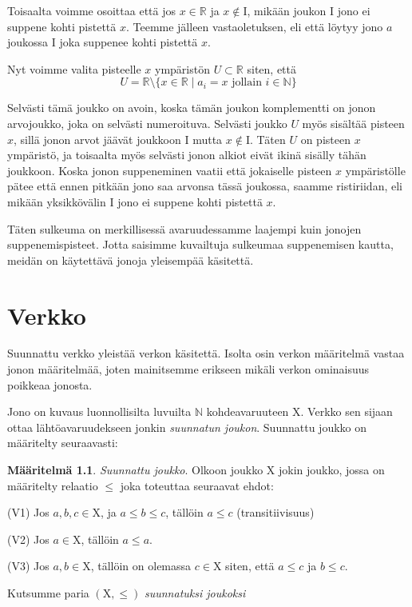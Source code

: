 \documentclass[12pt,a4paper,leqno]{report}
\newcommand{\R}{\mathbb{R}}
\newcommand{\N}{\mathbb{N}}
\newcommand{\X}{\mathrm{X}}
\newcommand{\I}{\mathrm{I}}
\newcommand{\verkop}{\leq}
\theoremstyle{plain}
\theoremstyle{definition}
\newtheorem{maar}[equation]{Määritelmä}
\theoremstyle{remark}
\begin{document}
Toisaalta voimme osoittaa että jos $x \in \R$ ja $x \not\in \I$, mikään joukon $\I$ jono ei suppene kohti pistettä $x$. Teemme jälleen vastaoletuksen, eli että löytyy jono $a$ joukossa $\I$ joka suppenee kohti pistettä $x$.

Nyt voimme valita pisteelle $x$ ympäristön $U \subset \R$ siten, että
\begin{equation}
U = \R \setminus \{x \in \R \mid a_i = x \text{ jollain } i \in \N \}
\end{equation}

Selvästi tämä joukko on avoin, koska tämän joukon komplementti on jonon arvojoukko, joka on selvästi numeroituva. Selvästi joukko $U$ myös sisältää pisteen $x$, sillä jonon arvot jäävät joukkoon $\I$ mutta $x \not\in \I$. Täten $U$ on pisteen $x$ ympäristö, ja toisaalta myös selvästi jonon alkiot eivät ikinä sisälly tähän joukkoon. Koska jonon suppeneminen vaatii että jokaiselle pisteen $x$ ympäristölle pätee että ennen pitkään jono saa arvonsa tässä joukossa, saamme ristiriidan, eli mikään yksikkövälin $\I$ jono ei suppene kohti pistettä $x$.

Täten sulkeuma on merkillisessä avaruudessamme laajempi kuin jonojen suppenemispisteet. Jotta saisimme kuvailtuja sulkeumaa suppenemisen kautta, meidän on käytettävä jonoja yleisempää käsitettä.

\chapter{Verkko}

Suunnattu verkko yleistää verkon käsitettä. Isolta osin verkon määritelmä vastaa jonon määritelmää, joten mainitsemme erikseen mikäli verkon ominaisuus poikkeaa jonosta.

Jono on kuvaus luonnollisilta luvuilta $\N$ kohdeavaruuteen $\X$. Verkko sen sijaan ottaa lähtöavaruudekseen jonkin \emph{suunnatun joukon}. Suunnattu joukko on määritelty seuraavasti:

\begin{maar}\label{suunjoukmaar}
\emph{Suunnattu joukko}. Olkoon joukko $\X$ jokin joukko, jossa on määritelty relaatio $\verkop$ joka toteuttaa seuraavat ehdot:

(V1) Jos $a, b, c \in \X$, ja $a \verkop b \verkop c$, tällöin $a \verkop c$ (transitiivisuus)

(V2) Jos $a \in \X$, tällöin $a \verkop a$.

(V3) Jos $a, b \in \X$, tällöin on olemassa $c \in \X$ siten, että $a \verkop c$ ja $b \verkop c$.

Kutsumme paria $(\X, \verkop)$ \emph{suunnatuksi joukoksi}
\end{maar}
\end{document}
